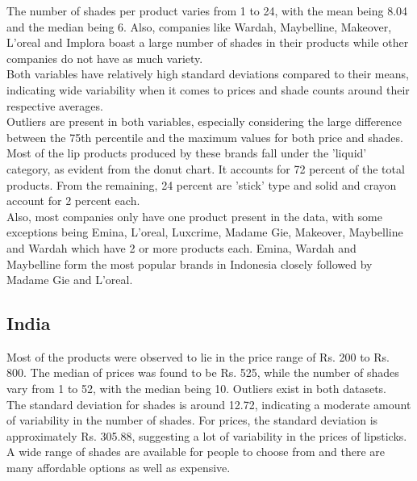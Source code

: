 \documentclass{article}
\begin{document}
\noindent The number of shades per product varies from 1 to 24, with the mean being 8.04 and the median being 6. Also, companies like Wardah, Maybelline, Makeover, L'oreal and Implora boast a large number of shades in their products while other companies do not have as much variety. \\

\noindent Both variables have relatively high standard deviations compared to their means, indicating wide variability when it comes to prices and shade counts around their respective averages. \\

\noindent Outliers are present in both variables, especially considering the large difference between the 75th percentile and the maximum values for both price and shades. \\

\noindent Most of the lip products produced by these brands fall under the 'liquid' category, as evident from the donut chart. It accounts for 72 percent of the total products. From the remaining, 24 percent are 'stick' type and solid and crayon account for 2 percent each. \\

\noindent Also, most companies only have one product present in the data, with some exceptions being Emina, L'oreal, Luxcrime, Madame Gie, Makeover, Maybelline and Wardah which have 2 or more products each. Emina, Wardah and Maybelline form the most popular brands in Indonesia closely followed by Madame Gie and L'oreal. \\

\subsection{India}
\noindent Most of the products were observed to lie in the price range of Rs. 200 to Rs. 800. The median of prices was found to be Rs. 525, while the number of shades vary from 1 to 52, with the median being 10. Outliers exist in both datasets.\\

\noindent The standard deviation for shades is around 12.72, indicating a moderate amount of variability in the number of shades. For prices, the standard deviation is approximately Rs. 305.88, suggesting a lot of variability in the prices of lipsticks. A wide range of shades are available for people to choose from and there are many affordable options as well as expensive.\\
\end{document}
